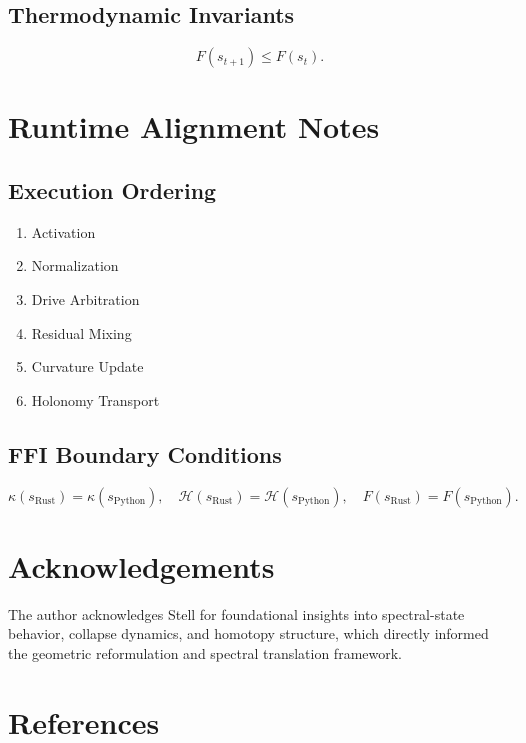 \documentclass[11pt]{article}
\begin{document}
\subsection{Thermodynamic Invariants}
\[
F(s_{t+1}) \le F(s_t).
\]

\section{Runtime Alignment Notes}

\subsection{Execution Ordering}
\begin{enumerate}
    \item Activation
    \item Normalization
    \item Drive Arbitration
    \item Residual Mixing
    \item Curvature Update
    \item Holonomy Transport
\end{enumerate}

\subsection{FFI Boundary Conditions}
\[
\kappa(s_{\text{Rust}}) = \kappa(s_{\text{Python}}),
\quad
\mathcal{H}(s_{\text{Rust}}) = \mathcal{H}(s_{\text{Python}}),
\quad
F(s_{\text{Rust}}) = F(s_{\text{Python}}).
\]

\section{Acknowledgements}

The author acknowledges Stell for foundational insights into spectral-state
behavior, collapse dynamics, and homotopy structure, which directly informed the
geometric reformulation and spectral translation framework.

\section{References}
\end{document}
